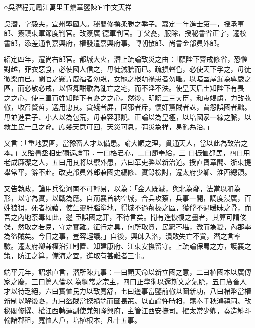 
\begin{pinyinscope}

 ○吳潛程元鳳江萬里王爚章鑒陳宜中文天祥



 吳潛，字毅夫，宣州寧國人。秘閣修撰柔勝之季子。嘉定十年進士第一，授承事郎、簽鎮東軍節度判官。改簽廣
 德軍判官。丁父憂，服除，授秘書省正字，遷校書郎，添差通判嘉興府，權發遣嘉興府事。轉朝散郎、尚書金部員外郎。



 紹定四年，遷尚右郎官。都城大火，潛上疏論致災之由：「願陛下齋戒修省，恐懼對越，菲衣惡食，必使國人信之，毋徒減膳而已。疏損聲色，必使天下孚之，毋徒徹樂而已。閹官之竊弄威福者勿親，女寵之根萌禍患者勿暱。以暗室屋漏為尊嚴之區，而必敬必戒，以恆舞酣歌為亂亡之宅，而不淫不泆。使皇天后土知陛下有畏
 之之心，使三軍百姓知陛下有憂之之心。然後，明詔二三大臣，和衷竭慮，力改弦轍，收召賢哲，選用忠良。貪殘者屏，回邪者斥，懷奸黨賊者誅，賈怨誤國者黜。毋並進君子、小人以為包荒，毋兼容邪說、正論以為皇極，以培國家一線之脈，以救生民一旦之命。庶幾天意可回，天災可息，弭災為祥，易亂為治。」



 又言：「重地要區，當豫畜人才以備患。論大順之理，貫通天人，當以此為致治之本。」又貽書丞相史彌遠論事：一曰格君心，二曰節奉給，三
 曰振恤都民，四曰用老成廉潔之人，五曰用良將以禦外患，六曰革吏弊以新治道。授直寶章閣、浙東提舉常平，辭不赴。改吏部員外郎兼國史編修、實錄檢討，遷太府少卿、淮西總領。



 又告執政，論用兵復河南不可輕易，以為：「金人既滅，與北為鄰，法當以和為形，以守為實，以戰為應。自荊襄首納空城，合兵攻蔡，兵事一開，調度浸廣，百姓狼狽，死者枕藉，使生靈肝腦塗地，得城不過荊榛之區，獲俘不過暖昧之骨，而吾之內地荼毒如此，邊
 臣誤國之罪，不待言矣。聞有進恢復之畫者，其算可謂俊傑，然取之若易，守之實難。征行之具，何所取資，民窮不堪，激而為變，內郡率為盜賊矣。今日之事，豈容輕議。」自後，興師入洛，潰敗失亡不貲，潛之言率驗。遷太府卿兼權沿江制置、知建康府、江東安撫留守。上疏論保蜀之方，護襄之策，防江之算，備海之宜，進取有甚難者三事。



 端平元年，詔求直言，潛所陳九事：一曰顧天命以新立國之意，二曰植國本以廣傳家之慶，三曰篤人倫以
 為綱常之宗主，四曰正學術以還斯文之氣脈，五曰廣畜人才以待乏絕，六曰實恤民力以致寬舒，七曰邊事當鑒前轍以圖新功，八曰楮幣當權新制以解後憂，九曰盜賊當探禍端而圖長策。以直論忤時相，罷奉千秋鴻禧祠。改秘閣修撰、權江西轉運副使兼知隆興府，主管江西安撫司。擢太常少卿，奏造斛斗輸諸郡租，寬恤人戶，培植根本，凡十五事。




\end{pinyinscope}
